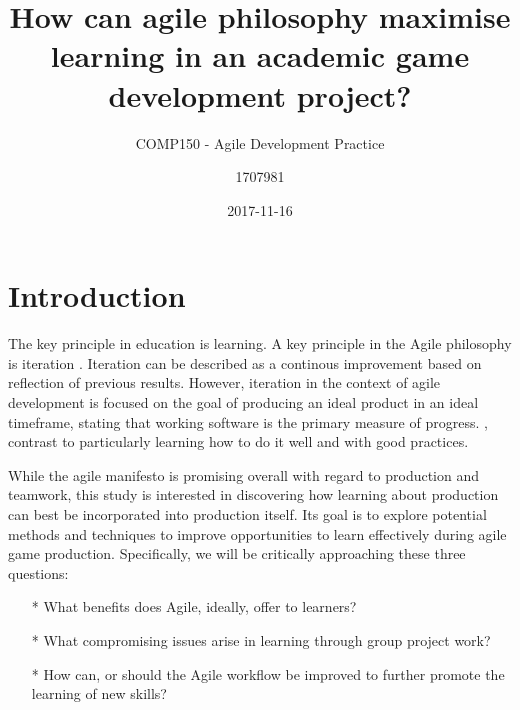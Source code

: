 \documentclass{scrartcl}
\title{How can agile philosophy maximise learning in an academic game development project?}
\subtitle{COMP150 - Agile Development Practice}
\date{2017-11-16}
\author{1707981}
\begin{document}
\maketitle
{}


\section{Introduction}
The key principle in education is learning. A key principle in the Agile philosophy is iteration \cite{agile}. Iteration can be described as a continous improvement based on reflection of previous results. \cite{iteration} However, iteration in the context of agile development is focused on the goal of producing an ideal product in an ideal timeframe, stating that working software is the primary measure of progress. \cite{manifesto}, contrast to particularly learning how to do it well and with good practices.

While the agile manifesto is promising overall with regard to production and teamwork, this study is interested in discovering how learning about production can best be incorporated into production itself. Its goal is to explore potential methods and techniques to improve opportunities to learn effectively during agile game production. Specifically, we will be critically approaching these three questions:

\begin{itemize}
\item[*]What benefits does Agile, ideally, offer to learners?
\item[*]What compromising issues arise in learning through group project work?
\item[*]How can, or should the Agile workflow be improved to further promote the learning of new skills?
\end{itemize}
\end{document}

